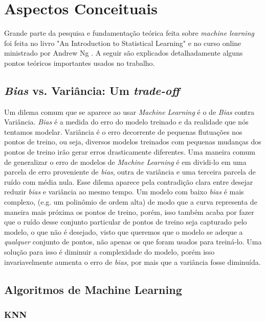 
\chapter{Aspectos Conceituais}\label{chp:fc}


Grande parte da pesquisa e fundamentação teórica feita sobre \textit{machine learning} foi feita no livro "An Introduction to Statistical Learning" \cite{statbook} e no curso online ministrado por Andrew Ng \cite{coursera}. A seguir são explicados detalhadamente alguns pontos teóricos importantes usados no trabalho.




\section{\textit{Bias} vs. Variância: Um \textit{trade-off} }


Um dilema comum que se aparece ao usar \textit{Machine Learning} é o de \textit{Bias} contra Variância. \textit{Bias} é a medida do erro do modelo treinado e da realidade que nós tentamos modelar. Variância é o erro decorrente de pequenas flutuações nos pontos de treino, ou seja, diversos modelos treinados com pequenas mudanças dos pontos de treino irão gerar erros drasticamente diferentes. Uma maneira comum de generalizar o erro de modelos de \textit{Machine Learning} é em dividi-lo em uma parcela de erro proveniente de \textit{bias}, outra de variância e uma terceira parcela de ruído com média nula. Esse dilema aparece pela contradição clara entre desejar reduzir \textit{bias} e variância ao mesmo tempo. Um modelo com baixo \textit{bias} é mais complexo, (e.g. um polinômio de ordem alta) de modo que a curva representa de maneira mais próxima os pontos de treino, porém, isso também acaba por fazer que o ruído desse conjunto particular de pontos de treino seja capturado pelo modelo, o que não é desejado, visto que queremos que o modelo se adeque a \textit{qualquer} conjunto de pontos, não apenas os que foram usados para treiná-lo. Uma solução para isso é diminuir a complexidade do modelo, porém isso invariavelmente aumenta o erro de \textit{bias}, por mais que a variância fosse diminuída.


\section{Algoritmos de Machine Learning}

\subsection{KNN}


